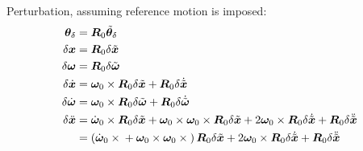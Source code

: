 \documentclass[10pt,fleqn,subeqn]{report}
\newcommand{\T}[1]{\bm{#1}}
\newcommand{\TT}[1]{\bm{#1}}
\begin{document}
Perturbation, assuming reference motion is imposed:
\begin{subequations}
\begin{align}
	\T{\theta}_{\delta}
	&= \TT{R}_0 \tilde{\T{\theta}}_{\delta} \\
	\delta\T{x} &= \TT{R}_0 \delta\tilde{\T{x}} \\
	\delta\T{\omega} &= \TT{R}_0 \delta\tilde{\T{\omega}} \\
	\delta\dot{\T{x}} &= 
		\T{\omega}_0 \times \TT{R}_0 \delta\tilde{\T{x}}
		+ \TT{R}_0 \delta\dot{\tilde{\T{x}}} \\
	\delta\dot{\T{\omega}} &= 
		\T{\omega}_0 \times \TT{R}_0 \delta\tilde{\T{\omega}}
		+ \TT{R}_0 \delta\dot{\tilde{\T{\omega}}} \\
	\delta\ddot{\T{x}}
		&= \dot{\T{\omega}}_0 \times \TT{R}_0 \delta\tilde{\T{x}}
		+ \T{\omega}_0 \times \T{\omega}_0 \times \TT{R}_0 \delta\tilde{\T{x}}
		+ 2 \T{\omega}_0 \times \TT{R}_0 \delta\dot{\tilde{\T{x}}}
		+ \TT{R}_0 \delta\ddot{\tilde{\T{x}}}
		\nonumber \\
		&= \plbr{
			\dot{\T{\omega}}_0 \times{}
			+ \T{\omega}_0 \times \T{\omega}_0 \times{}
		} \TT{R}_0 \delta\tilde{\T{x}}
		+ 2 \T{\omega}_0 \times \TT{R}_0 \delta\dot{\tilde{\T{x}}}
		+ \TT{R}_0 \delta\ddot{\tilde{\T{x}}}
\end{align}
\end{subequations}
\end{document}
